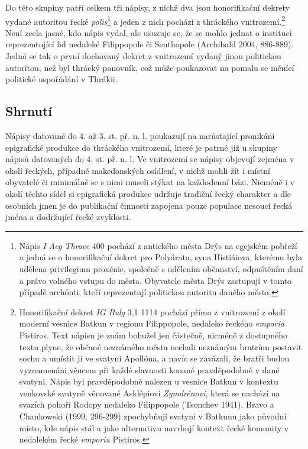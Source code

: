Do této skupiny patří celkem tři nápisy, z nichž dva jsou honorifikační dekrety vydané autoritou řecké {\em polis}\footnote{Nápis {\em I Aeg Thrace} 400 pochází z antického města Drýs na egejském pobřeží a jedná se o honorifikační dekret pro Polyárata, syna Histiáiova, kterému byla udělena privilegium proxénie, společně s udělením občanství, odpuštěním daní a právo volného vstupu do města. Obyvatele města Drýs zastupují v tomto případě archónti, kteří reprezentují politickou autoritu daného města.} a jeden z nich pochází z thráckého vnitrozemí.\footnote{Honorifikační dekret {\em IG Bulg} 3,1 1114 pochází přímo z vnitrozemí z okolí moderní vesnice Batkun v regionu Filippopole, nedaleko řeckého {\em emporia} Pistiros. Text nápisu je znám bohužel jen částečně, nicméně z dostupného textu plyne, že občané neznámého města nechali neznámým bratrům postavit sochu a umístit jí ve svatyni Apollóna, a navíc se zavázali, že bratři budou vyznamenáni věncem při každé slavnosti konané pravděpodobně v dané svatyni. Nápis byl pravděpodobně nalezen u vesnice Batkun v kontextu venkovské svatyně věnované Asklépiovi {\em Zymdrénovi}, která se nachází na svazích pohoří Rodopy nedaleko Filippopole (Tsonchev 1941). Bravo a Chankowski (1999, 296-299) zpochybňují svatyni v Batkunu jako původní místo, kde nápis stál a jako alternativu navrhují kontext řecké komunity v nedalekém řecké {\em emporiu} Pistiros.} Není zcela jasné, kdo nápis vydal, ale usuzuje se, že se mohlo jednat o instituci reprezentující lid nedaleké Filippopole či Seuthopole (Archibald 2004, 886-889). Jedná se tak o první dochovaný dekret z vnitrozemí vydaný jinou politickou autoritou, než byl thrácký panovník, což může poukazovat na pomalu se měnící politické uspořádání v Thrákii.

\subsection[shrnutí-8]{Shrnutí}

Nápisy datované do 4. až 3. st. př. n. l. poukazují na narůstající pronikání epigrafické produkce do thráckého vnitrozemí, které je patrné již u skupiny nápisů datovaných do 4. st. př. n. l. Ve vnitrozemí se nápisy objevují zejména v okolí řeckých, případně makedonských osídlení, v nichž mohli žít i místní obyvatelé či minimálně se s nimi museli stýkat na každodenní bázi. Nicméně i v okolí těchto sídel si epigrafická produkce udržuje tradiční řecký charakter a dle osobních jmen je do publikační činnosti zapojena pouze populace nesoucí řecká jména a dodržující řecké zvyklosti.

